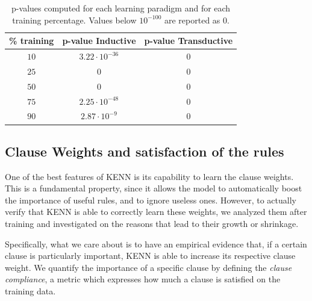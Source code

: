 \begin{table}[h]
	\caption{p-values computed for each learning paradigm and for each training percentage. Values below $10^{-100}$ are reported as $0$.}
	\label{tab:p_vals}
	\centering
	\begin{tabular}{c|cc} 
		\% training & p-value Inductive & p-value Transductive \\
		\hline 
		\rule{0pt}{3ex}    $10$ & $3.22 \cdot 10^{-36}$ & $0$ \\
		$25$ & $0$ & $0$ \\
		$50$ & $0$ & $0$ \\
		$75$ & $2.25 \cdot 10^{-48}$ & $0$ \\
		$90$ & $2.87 \cdot 10^{-9}$ & $0$ \\	
		\hline \hline
	\end{tabular}
\end{table}

\subsection{Clause Weights and satisfaction of the rules}

One of the best features of KENN is its capability to learn the clause weights. This is a fundamental property, since it allows the model to automatically boost the importance of useful rules, and to ignore useless ones. However, to actually verify that KENN is able to correctly learn these weights, we analyzed them after training and investigated on the reasons that lead to their growth or shrinkage.

Specifically, what we care about is to have an empirical evidence that, if a certain clause is particularly important, KENN is able to increase its respective clause weight. We quantify the importance of a specific clause by defining the \textit{clause compliance}, a metric which expresses how much a clause is satisfied on the training data. 

